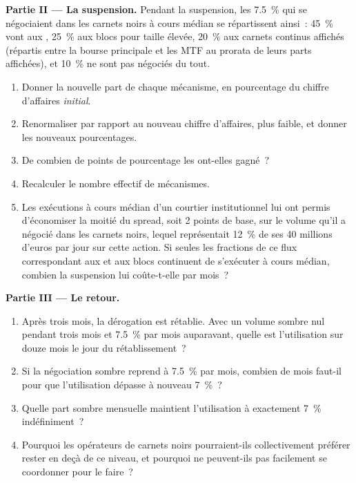 \begin{problem}
\medskip\noindent\textbf{Partie II --- La suspension.}
Pendant la suspension, les 7.5~\% qui se négociaient dans les carnets noirs à cours médian
se répartissent ainsi~: 45~\% vont aux , 25~\% aux blocs pour taille élevée, 20~\%
aux carnets continus affichés (répartis entre la bourse principale et les MTF au prorata de leurs parts affichées),
et 10~\% ne sont pas négociés du tout.
\begin{enumerate}[resume]
\item Donner la nouvelle part de chaque mécanisme, en pourcentage du
chiffre d'affaires \emph{initial}.
\item Renormaliser par rapport au nouveau chiffre d'affaires, plus faible, et donner les nouveaux pourcentages.
\item De combien de points de pourcentage les  ont-elles gagné~?
\item Recalculer le nombre effectif de mécanismes.
\item Les exécutions à cours médian d'un courtier institutionnel lui ont permis d'économiser la moitié du spread, soit 2
points de base, sur le volume qu'il a négocié dans les carnets noirs, lequel représentait 12~\% de ses 40 millions d'euros
par jour sur cette action. Si seules les fractions de ce flux correspondant aux  et aux blocs
continuent de s'exécuter à cours médian, combien la suspension lui coûte-t-elle
par mois~?
\end{enumerate}

\medskip\noindent\textbf{Partie III --- Le retour.}
\begin{enumerate}[resume]
\item Après trois mois, la dérogation est rétablie. Avec un volume sombre nul pendant
trois mois et 7.5~\% par mois auparavant, quelle est l'utilisation sur douze mois
le jour du rétablissement~?
\item Si la négociation sombre reprend à 7.5~\% par mois, combien de mois faut-il
pour que l'utilisation dépasse à nouveau 7~\%~?
\item Quelle part sombre mensuelle maintient l'utilisation à exactement 7~\% indéfiniment~?
\item Pourquoi les opérateurs de carnets noirs pourraient-ils collectivement préférer rester en deçà
de ce niveau, et pourquoi ne peuvent-ils pas facilement se coordonner pour le faire~?
\end{enumerate}


\end{problem}

